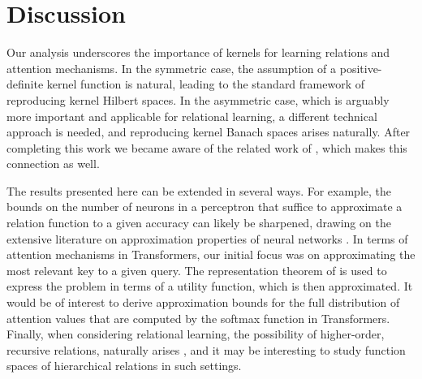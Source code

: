 \section{Discussion}

Our analysis underscores the importance of kernels for learning relations and attention mechanisms. In the symmetric case, the assumption of a positive-definite kernel function is natural, leading to the standard framework of reproducing kernel Hilbert spaces. In the asymmetric case, which is arguably more important and applicable for relational learning, a different technical approach is needed, and reproducing kernel Banach spaces arises naturally. After completing this work we became aware of the related work of \citet{wright2021transformers}, which makes this connection as well.

The results presented here can be extended in several ways. For example, the bounds on the number of neurons in a perceptron that suffice to approximate a relation function to a given accuracy can likely be sharpened, drawing on the extensive literature on approximation properties of neural networks \citep[e.g.,][]{petrushev1998approximation,pinkus1999approximation,makovoz1998uniform,burger2001error,maiorov2006approximation,bachBreakingCurseDimensionality2016}. In terms of attention mechanisms in Transformers, our initial focus was on approximating the most relevant key to a given query. The representation theorem of \citet{debreuRepresentationPreferenceOrdering1954} is used to express the problem in terms of a utility function, which is then approximated. It would be of interest to derive approximation bounds for the full distribution of attention values that are computed by the softmax function in Transformers. Finally, when considering relational learning, the possibility of higher-order, recursive relations, naturally arises \citep[e.g.,][]{altabaaRelationalConvolutionalNetworks2023}, and it may be interesting to study function spaces of hierarchical relations in such settings.
